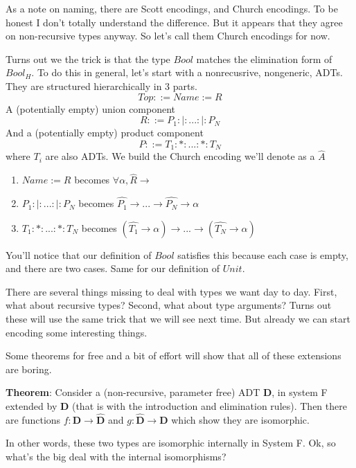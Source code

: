 \documentclass[12pt]{article}
\begin{document}
As a note on naming, there are Scott encodings, and Church encodings.
To be honest I don't totally understand the difference.
But it appears that they agree on non-recursive types anyway.
So let's call them Church encodings for now.

Turns out we the trick is that the type $Bool$ matches the elimination form of $Bool_H$. 
To do this in general, let's start with a  nonrecusrive, nongeneric, ADTs.
They are structured hierarchically in 3 parts.
\[
  Top ::= Name := R
\]
A (potentially empty) union component 
\[
  R ::= P_1 :|: ... :|: P_N
\]
And a (potentially empty) product component
\[
  P ::= T_1 :*: ... :*: T_N
\]
where $T_i$ are also ADTs.
We build the Church encoding we'll denote as a $\hat{A}$
\begin{enumerate}
    \item $Name := R$ becomes  $\forall \alpha, \hat{R} \rightarrow $
    \item $P_1 :|: ... :|: P_N$ becomes $ \hat{P_1} \rightarrow ... \rightarrow \hat{P_N} \rightarrow \alpha$
    \item $T_1 :*: ... :*: T_N$ becomes $
        (\hat{T_1} \rightarrow \alpha) \rightarrow  ... 
        \rightarrow (\hat{T_N} \rightarrow \alpha)$
\end{enumerate}

You'll notice that our definition of $Bool$ satisfies this because
each case is empty, and there are two cases.
Same for our definition of $Unit$.

There are several things missing to deal with types we want day to day.
First, what about recursive types?
Second, what about type arguments?
Turns out these will use the same trick that we will see next time.
But already we can start encoding some interesting things.

Some theorems for free and a bit of effort will show that all of these extensions are boring.
\newline

\textbf{Theorem}: Consider a (non-recursive, parameter free) ADT \textbf{D}, in system F extended by \textbf{D} (that is with the introduction and elimination rules). 
Then there are functions $f : \textbf{D} \rightarrow \hat{\textbf{D}}$ and $g : \hat{\textbf{D}} \rightarrow \textbf{D}$ which show they are isomorphic.
\newline

In other words, these two types are isomorphic internally in System F.
Ok, so what's the big deal with the internal isomorphisms?
\end{document}
